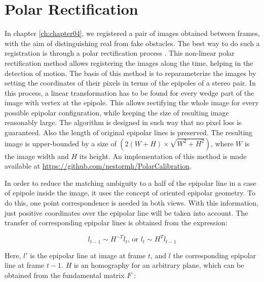 
\graphicspath{{./images/chapter04/bmps/}{./images/chapter04/vects/}{./images/chapter04/}}

\chapter{Polar Rectification}\label{ch:appendix_polar_calib}

In chapter \ref{ch:chapter04}, we registered a pair of images obtained between frames, with the aim of distinguishing real from fake obstacles. The best way to do such a registration is through a polar rectification process \citep{pollefeys1999simple}. This non-linear polar rectification method allows registering the images along the time, helping in the detection of motion. The basis of this method is to reparameterize the images by setting the coordinates of their pixels in terms of the epipoles of a stereo pair. In this process, a linear transformation has to be found for every wedge part of the image with vertex at the epipole. This allows rectifying the whole image for every possible epipolar configuration, while keeping the size of resulting image reasonably large. The algorithm is designed in such way that no pixel loss is guaranteed. Also the length of original epipolar lines is preserved. The resulting image is upper-bounded by a size of $(2 (W + H) \times \sqrt{W^2 + H^2})$, where $W$ is the image width and $H$ its height. An implementation of this method is made available at \url{https://github.com/nestormh/PolarCalibration}.

In order to reduce the matching ambiguity to a half of the epipolar line in a case of epipole inside the image, it uses the concept of oriented epipolar geometry. To do this, one point correspondence is needed in both views. With this information, just positive coordinates over the epipolar line will be taken into account. The transfer of corresponding epipolar lines is obtained from the expression:

\begin{equation}\label{eq:cp04_epipolar_lines}
l_{t - 1} \sim H^{-T}l_t\text{, or }l_t \sim H^T l_{t - 1}
\end{equation}

Here, $l'$ is the epipolar line at image at frame $t$, and $l$ the corresponding epipolar line at frame $t - 1$. $H$ is an homography for an arbitrary plane, which can be obtained from the fundamental matrix $F$ \citep{luong1996fundamental}:

